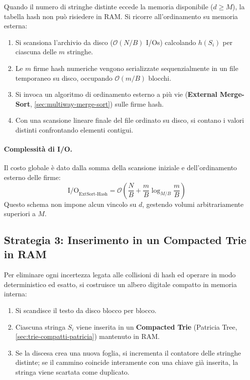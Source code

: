 Quando il numero di stringhe distinte eccede la memoria disponibile ($d \ge M$), la tabella hash non pu\`o risiedere in RAM. Si ricorre all'ordinamento su memoria esterna:
\begin{enumerate}
  \item Si scansiona l'archivio da disco ($\mathcal{O}(N/B)$ I/Os) calcolando $h(S_i)$ per ciascuna delle $m$ stringhe.
  \item Le $m$ firme hash numeriche vengono serializzate sequenzialmente in un file temporaneo su disco, occupando $\mathcal{O}(m/B)$ blocchi.
  \item Si invoca un algoritmo di ordinamento esterno a pi\`u vie (\textbf{External Merge-Sort}, \autoref{sec:multiway-merge-sort}) sulle firme hash.
  \item Con una scansione lineare finale del file ordinato su disco, si contano i valori distinti confrontando elementi contigui.
\end{enumerate}

\paragraph{Complessità di I/O.}
Il costo globale \`e dato dalla somma della scansione iniziale e dell'ordinamento esterno delle firme:
\begin{equation}
  \text{I/O}_{\text{ExtSort-Hash}} = \mathcal{O}\left(\frac{N}{B} + \frac{m}{B} \log_{M/B} \frac{m}{B}\right)
\end{equation}
Questo schema non impone alcun vincolo su $d$, gestendo volumi arbitrariamente superiori a $M$.

\FloatBarrier
\subsection{Strategia 3: Inserimento in un Compacted Trie in RAM}
\label{subsec:soluzione-3-compacted-trie-ram}

Per eliminare ogni incertezza legata alle collisioni di hash ed operare in modo deterministico ed esatto, si costruisce un albero digitale compatto in memoria interna:
\begin{enumerate}
  \item Si scandisce il testo da disco blocco per blocco.
  \item Ciascuna stringa $S_i$ viene inserita in un \textbf{Compacted Trie} (Patricia Tree, \autoref{sec:trie-compatti-patricia}) mantenuto in RAM.
  \item Se la discesa crea una nuova foglia, si incrementa il contatore delle stringhe distinte; se il cammino coincide interamente con una chiave gi\`a inserita, la stringa viene scartata come duplicato.
\end{enumerate}

